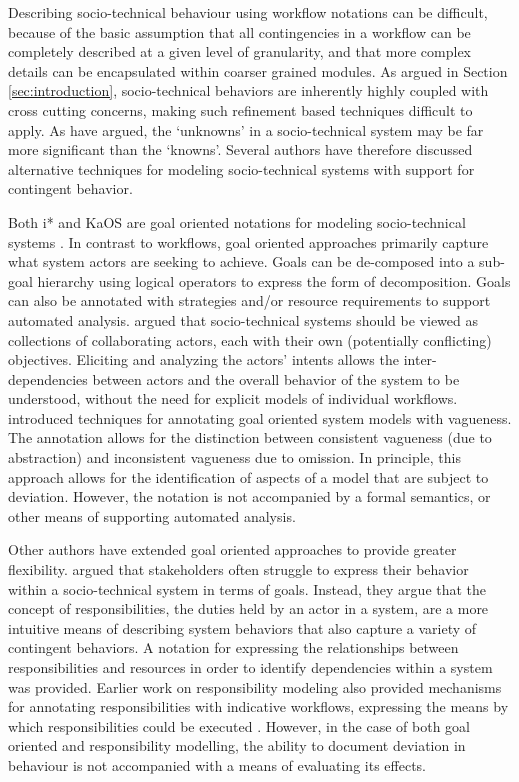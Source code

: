 \documentclass{llncs}
\begin{document}
Describing socio-technical behaviour using workflow notations can be difficult, because of the basic assumption that all
contingencies in a workflow can be completely described at a given level of granularity, and that more complex details
can be encapsulated within coarser grained modules.  As argued in Section \ref{sec:introduction}, socio-technical
behaviors are inherently highly coupled with cross cutting concerns, making such refinement based techniques difficult
to apply.  As \citet{israilidis13ignorance} have argued, the `unknowns' in a socio-technical system may be far more
significant than the `knowns'. Several authors have therefore discussed alternative techniques for modeling
socio-technical systems with support for contingent behavior.

Both i* \citep{yu1995social} and KaOS \citep{dardenne93goal} are goal oriented notations for modeling socio-technical
systems \cite{werneck2009goreistarkaos}.  In contrast to workflows, goal oriented approaches primarily capture what
system actors are seeking to achieve.  Goals can be de-composed into a sub-goal hierarchy using logical operators to
express the form of decomposition. Goals can also be annotated with strategies and/or resource requirements to support
automated analysis.  \citet{yu1995social} argued that socio-technical systems should be viewed as collections of
collaborating actors, each with their own (potentially conflicting) objectives.  Eliciting and analyzing the actors'
intents allows the inter-dependencies between actors and the overall behavior of the system to be understood, without
the need for explicit models of individual workflows. \citet{herrmann1999vagueness} introduced techniques for annotating
goal oriented system models with vagueness.  The annotation allows for the distinction between consistent vagueness (due
to abstraction) and inconsistent vagueness due to omission.  In principle, this approach allows for the identification
of aspects of a model that are subject to deviation.  However, the notation is not accompanied by a formal semantics,
or other means of supporting automated analysis.

Other authors have extended goal oriented approaches to provide greater flexibility. \citet{sommerville09deriving}
argued that stakeholders often struggle to express their behavior within a socio-technical system in terms of goals.
Instead, they argue that the concept of responsibilities, the duties held by an actor in a system, are a more intuitive
means of describing system behaviors that also capture a variety of contingent behaviors.  A notation for expressing the
relationships between responsibilities and resources in order to identify dependencies within a system was provided.
Earlier work on responsibility modeling also provided mechanisms for annotating responsibilities with indicative
workflows, expressing the means by which responsibilities could be executed \citep{dewsbury07responsibility}.  However,
in the case of both goal oriented and responsibility modelling, the ability to document deviation in behaviour is not
accompanied with a means of evaluating its effects.
\end{document}
